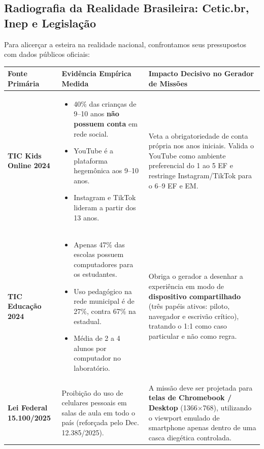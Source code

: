 \documentclass[11pt,a4paper]{article}
\begin{document}
\subsection{Radiografia da Realidade Brasileira: Cetic.br, Inep e Legisla\c{c}\~ao}

Para alicer\c{c}ar a esteira na realidade nacional, confrontamos seus pressupostos com dados p\'ublicos oficiais:

\begin{center}
\small
\begin{tabularx}{\textwidth}{@{}l p{5.5cm} X@{}}
\toprule
\textbf{Fonte Prim\'aria} & \textbf{Evid\^encia Emp\'irica Medida} & \textbf{Impacto Decisivo no Gerador de Miss\~oes} \\
\midrule
\textbf{TIC Kids Online 2024} & 
\begin{itemize}[leftmargin=*]
  \item 40\% das crian\c{c}as de 9--10 anos \textbf{n\~ao possuem conta} em rede social.
  \item YouTube \'e a plataforma hegem\^onica aos 9--10 anos.
  \item Instagram e TikTok lideram a partir dos 13 anos.
\end{itemize} & 
Veta a obrigatoriedade de conta pr\'opria nos anos iniciais. Valida o YouTube como ambiente preferencial do 1\textordmasculine{} ao 5\textordmasculine{} EF e restringe Instagram/TikTok para o 6\textordmasculine{}--9\textordmasculine{} EF e EM. \\
\midrule
\textbf{TIC Educa\c{c}\~ao 2024} & 
\begin{itemize}[leftmargin=*]
  \item Apenas 47\% das escolas possuem computadores para os estudantes.
  \item Uso pedag\'ogico na rede municipal \'e de 27\%, contra 67\% na estadual.
  \item M\'edia de 2 a 4 alunos por computador no laborat\'orio.
\end{itemize} & 
Obriga o gerador a desenhar a experi\^encia em modo de \textbf{dispositivo compartilhado} (tr\^es pap\'eis ativos: piloto, navegador e escriv\~ao cr\'itico), tratando o 1:1 como caso particular e n\~ao como regra. \\
\midrule
\textbf{Lei Federal 15.100/2025} & 
Proibi\c{c}\~ao do uso de celulares pessoais em salas de aula em todo o pa\'is (refor\c{c}ada pelo Dec. 12.385/2025). & 
A miss\~ao deve ser projetada para \textbf{telas de Chromebook / Desktop} (1366$\times$768), utilizando o viewport emulado de smartphone apenas dentro de uma casca dieg\'etica controlada. \\

\end{tabularx}
\end{center}
\end{document}
